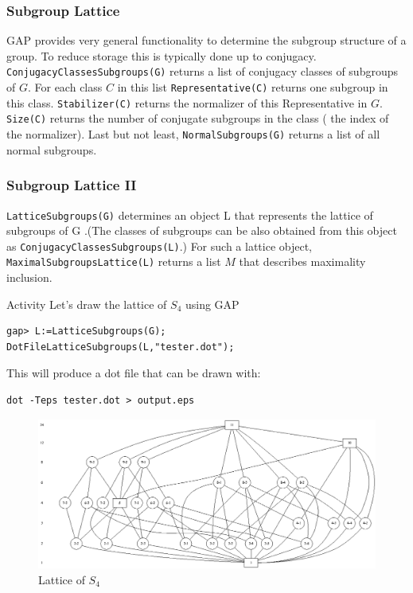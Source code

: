 \documentclass{beamer}
\theoremstyle{definition}
\theoremstyle{remark}
\begin{document}
\begin{frame}[fragile]
	\frametitle{Subgroup Lattice}
	GAP  provides very general functionality to determine the subgroup structure of a group. To reduce storage this is typically done up to
	conjugacy.
	\texttt{ConjugacyClassesSubgroups(G)} returns a list of conjugacy classes of subgroups of $ G $. For each class $ C $ in this list \texttt{Representative(C)} returns one subgroup in this class. \texttt{Stabilizer(C)} returns the normalizer of this Representative in $ G $. \texttt{Size(C)} returns the number of conjugate subgroups
	in the class ( the index of the normalizer). 
	Last but not least, \texttt{NormalSubgroups(G)} returns a list of all normal subgroups.
	
\end{frame}

\begin{frame}[fragile]
	\frametitle{Subgroup Lattice II}
\texttt{LatticeSubgroups(G)} determines an object L that represents the lattice of subgroups of G .(The classes of subgroups can be also obtained from this object as \texttt{ConjugacyClassesSubgroups(L)}.)
For such a lattice object, \texttt{MaximalSubgroupsLattice(L)} returns a list $ M $ that describes maximality
inclusion.
\pause
\begin{alertblock}{Activity}
	Let's draw the lattice of $ S_4 $ using GAP
\end{alertblock}
\begin{verbatim}
gap> L:=LatticeSubgroups(G);
DotFileLatticeSubgroups(L,"tester.dot");
\end{verbatim}
This will produce a dot file that can be drawn with:
\begin{verbatim}
dot -Teps tester.dot > output.eps
\end{verbatim}
\end{frame}

\begin{frame}[fragile]
\begin{figure}
	\centering
	\includegraphics[width=1.0\linewidth]{output}
	\caption{Lattice of $S_4$}
	\label{S4}
\end{figure}

\end{frame}
\end{document}
